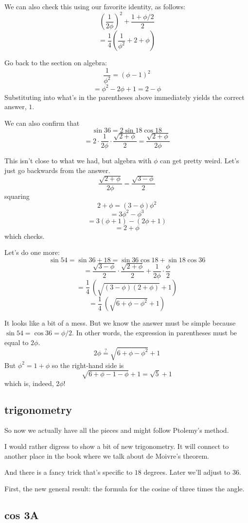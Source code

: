 \documentclass[11pt, oneside]{article}
\begin{document}
We can also check this using our favorite identity, as follows:
\[ (\frac{1}{2 \phi})^2 + \frac{1 + \phi/2}{2} \]
\[ = \frac{1}{4} ( \frac{1}{\phi^2} + 2 + \phi) \]

Go back to the section on algebra:
\[ \frac{1}{\phi^2} = (\phi - 1)^2 \]
\[ = \phi^2 - 2 \phi + 1 = 2 - \phi \]
Substituting into what's in the parentheses above immediately yields the correct answer, $1$.

We can also confirm that
\[ \sin 36 = 2 \sin 18 \cos 18 \]
\[ = 2 \cdot \frac{1}{2 \phi} \cdot \frac{\sqrt{2 + \phi}}{2} = \frac{\sqrt{2 + \phi}}{2 \phi} \]

This isn't close to what we had, but algebra with $\phi$ can get pretty weird.  Let's just go backwards from the answer.  
\[  \frac{\sqrt{2 + \phi}}{2 \phi} =  \frac{\sqrt{3 - \phi}}{2} \]
squaring
\[ 2 + \phi = (3 - \phi) \phi^2 \]
\[ = 3 \phi^2 - \phi^3 \]
\[ = 3(\phi + 1) - (2\phi + 1) \]
\[ = 2 + \phi \]
which checks.

Let's do one more:
\[ \sin 54 = \sin 36 + 18 = \sin 36 \cos 18 + \sin 18 \cos 36 \]
\[ = \frac{\sqrt{3 - \phi}}{2} \cdot \frac{ \sqrt{2 + \phi}}{2} + \frac{1}{2 \phi} \cdot \frac{\phi}{2} \]
\[ = \frac{1}{4} \ (\sqrt{(3 - \phi)(2 + \phi)} + 1) \]
\[ = \frac{1}{4} \ (\sqrt{6 + \phi - \phi^2 } + 1) \]

It looks like a bit of a mess.  But we know the answer must be simple because $\sin 54 = \cos 36 = \phi/2$.  In other words, the expression in parentheses must be equal to $2 \phi$.
\[ 2 \phi \stackrel{?}{=} \sqrt{6 + \phi - \phi^2} + 1\]
But $\phi^2 = 1 + \phi$ so the right-hand side is
\[ \sqrt{6 + \phi - 1 - \phi} + 1 = \sqrt{5} + 1 \]
which is, indeed, $2 \phi$!

\subsection*{trigonometry}

So now we actually have all the pieces and might follow Ptolemy's method.

I would rather digress to show a bit of new trigonometry.  It will connect to another place in the book where we talk about de Moivre's theorem.

And there is a fancy trick that's specific to $18$ degrees.  Later we'll adjust to $36$.

First, the new general result:  the formula for the cosine of three times the angle.

\subsection*{cos 3A}
\end{document}
